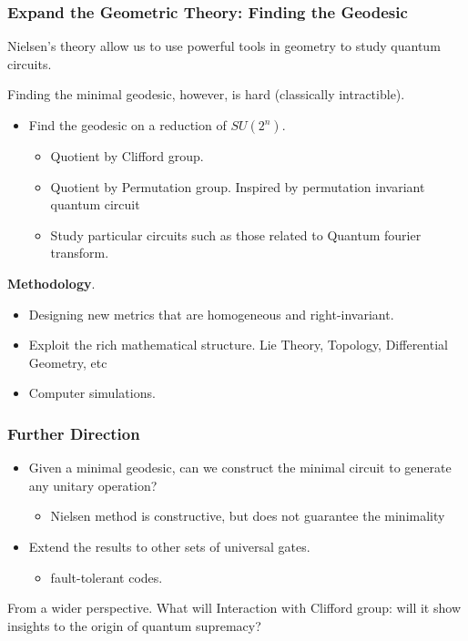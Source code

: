 \documentclass[aspectratio=169]{beamer}
\begin{document}
\begin{frame}
	\frametitle{Expand the Geometric Theory: Finding the Geodesic}	
	Nielsen's theory allow us to use powerful tools in geometry to study quantum circuits. 

	Finding the minimal geodesic, however, is hard (classically intractible).
	\begin{itemize}
		\item Find the geodesic on a reduction of $SU(2^n)$.
		\begin{itemize}
			\item Quotient by Clifford group.
			\item Quotient by Permutation group. Inspired by permutation invariant quantum circuit \citep{mansky2023permutationinvariantquantumcircuits}
			\item Study particular circuits such as those related to Quantum fourier transform.
		\end{itemize}
	\end{itemize}

	\textbf{Methodology}. 
	\begin{itemize}
		\item Designing new metrics that are homogeneous and right-invariant.
		\item Exploit the rich mathematical structure. Lie Theory, Topology, Differential Geometry, etc 
		\item Computer simulations.
	\end{itemize}
\end{frame}

\begin{frame}
	\frametitle{Further Direction}
	\begin{itemize}
		\item Given a minimal geodesic, can we construct the minimal circuit to generate any unitary operation? 
		\begin{itemize}
			\item Nielsen method is constructive, but does not guarantee the minimality
		\end{itemize}
		\item Extend the results to other sets of universal gates.
		\begin{itemize}
			\item fault-tolerant codes.
		\end{itemize}
	\end{itemize}
	From a wider perspective. What will
	Interaction with Clifford group: will it show insights to the origin of quantum supremacy?
\end{frame}
\end{document}
